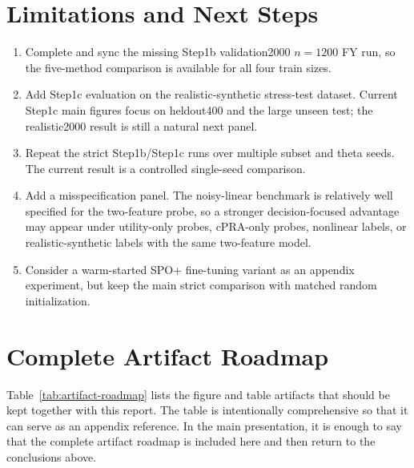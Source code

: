 \documentclass[11pt]{article}
\begin{document}
\section{Limitations and Next Steps}

\begin{enumerate}[leftmargin=2.2em]
    \item Complete and sync the missing Step1b validation2000 \(n=1200\) FY run,
    so the five-method comparison is available for all four train sizes.

    \item Add Step1c evaluation on the realistic-synthetic stress-test dataset.
    Current Step1c main figures focus on heldout400 and the large unseen test; the
    realistic2000 result is still a natural next panel.

    \item Repeat the strict Step1b/Step1c runs over multiple subset and theta
    seeds. The current result is a controlled single-seed comparison.

    \item Add a misspecification panel. The noisy-linear benchmark is relatively
    well specified for the two-feature probe, so a stronger decision-focused
    advantage may appear under utility-only probes, cPRA-only probes, nonlinear
    labels, or realistic-synthetic labels with the same two-feature model.

    \item Consider a warm-started SPO+ fine-tuning variant as an appendix
    experiment, but keep the main strict comparison with matched random
    initialization.
\end{enumerate}

\clearpage
\appendix
\section{Complete Artifact Roadmap}

Table~\ref{tab:artifact-roadmap} lists the figure and table artifacts that should
be kept together with this report. The table is intentionally comprehensive so
that it can serve as an appendix reference. In the main presentation, it is
enough to say that the complete artifact roadmap is included here and then
return to the conclusions above.
\end{document}
